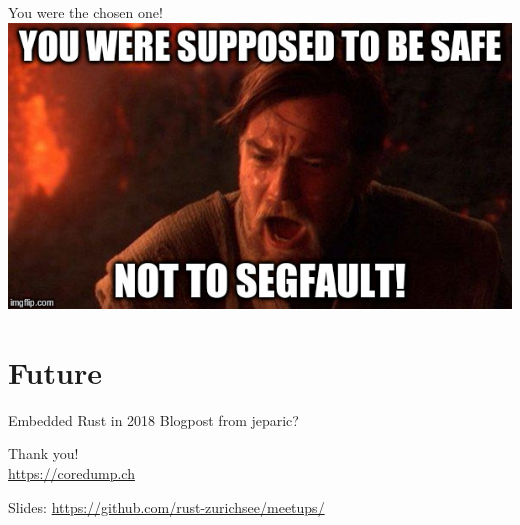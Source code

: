 \documentclass[aspectratio=1610,14pt,t]{beamer}
\begin{document}
\begin{frame}[c]{You were the chosen one!}
  \centering
  \includegraphics[width=.8\textwidth]{img/not-so-safe-rust.jpg}
\end{frame}

\section{Future}

\begin{frame}[c]{Embedded Rust in 2018}
  Blogpost from jeparic?
\end{frame}


{
\begin{frame}[standout]
  \begin{centering}
    {\Huge Thank you!}\\
    {\normalsize \url{https://coredump.ch}}\\
  \end{centering}
  {\small Slides: \url{https://github.com/rust-zurichsee/meetups/}}\\
  \vspace{3cm}
\end{frame}
}
\end{document}

